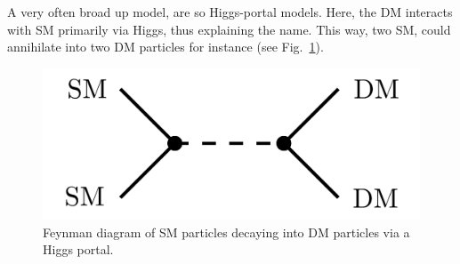 A very often broad up model, are so Higgs-portal models. Here, the \acs{DM} interacts with \acs{SM} primarily via Higgs, thus explaining the name. This way, two \acs{SM}, could annihilate into two \acs{DM} particles for instance (see Fig.~\ref{fig:3:Higgs_portal}).
\begin{figure}[h]
\centering
\includegraphics[scale=0.2]{Images/Higgs_portal.pdf}
\caption{Feynman diagram of \acs{SM} particles decaying into \acs{DM} particles via a Higgs portal.}
\label{fig:3:Higgs_portal}
\end{figure}

